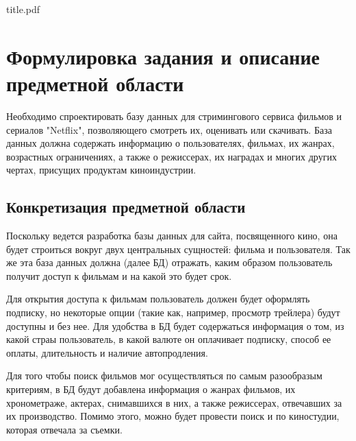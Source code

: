 

\def\oldbibitem{}
\let\oldbibitem=\bibitem
\def\bibitem{\stepcounter{citenum}\oldbibitem}



{title.pdf}

\tableofcontents
\newpage
\section{Формулировка задания и описание предметной области}
Необходимо спроектировать базу данных для стримингового сервиса фильмов и сериалов "Netflix", позволяющего смотреть их, оценивать или скачивать.
База данных должна содержать информацию о пользователях, фильмах, их жанрах, возрастных ограничениях, а также о режиссерах, их наградах и многих других
чертах, присущих продуктам киноиндустрии.

\subsection{Конкретизация предметной области}
Поскольку ведется разработка базы данных для сайта, посвященного кино, она будет строиться вокруг двух центральных сущностей: фильма и пользователя.
Так же эта база данных должна (далее БД) отражать, каким образом пользователь получит доступ к фильмам и на какой это будет срок.

Для открытия доступа к фильмам пользователь должен будет оформлять подписку, но некоторые опции (такие как, например, просмотр трейлера) будут доступны
и без нее. Для удобства в БД будет содержаться информация о том, из какой страы пользователь, в какой валюте он оплачивает подписку, способ ее оплаты,
длительность и наличие автопродления.

Для того чтобы поиск фильмов мог осуществляться по самым разообразым критериям, в БД будут добавлена информация о жанрах фильмов, их хронометраже,
актерах, снимавшихся в них, а также режиссерах, отвечавших за их производство. Помимо этого, можно будет провести поиск и по киностудии,
которая отвечала за съемки.

